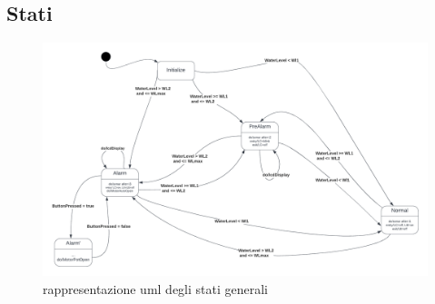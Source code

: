 \documentclass[a4paper,12pt]{report}
\begin{document}
\subsection{Stati}
\begin{figure}[H]
    \centering
    \includegraphics[width=13cm]{diagramma stati.png}
    \caption{rappresentazione uml degli stati generali}
\end{figure}
\end{document}
